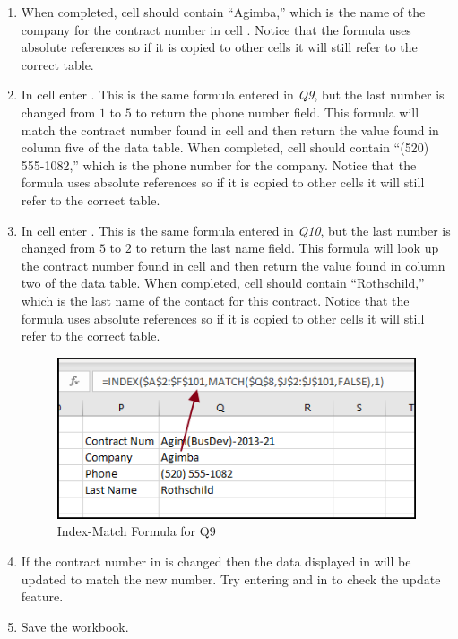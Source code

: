 \begin{enumerate}
	\item When completed, cell  should contain ``Agimba,'' which is the name of the company for the contract number in cell . Notice that the formula uses absolute references so if it is copied to other cells it will still refer to the correct table.
	\item In cell  enter . This is the same formula entered in \textit{Q9}, but the last number is changed from $ 1 $ to $ 5 $ to return the phone number field. This formula will match the contract number found in cell  and then return the value found in column five of the data table. When completed, cell  should contain ``(520) 555-1082,'' which is the phone number for the company.  Notice that the formula uses absolute references so if it is copied to other cells it will still refer to the correct table. 
	\item In cell  enter . This is the same formula entered in \textit{Q10}, but the last number is changed from $ 5 $ to $ 2 $ to return the last name field. This formula will look up the contract number found in cell  and then return the value found in column two of the data table. When completed, cell  should contain ``Rothschild,'' which is the last name of the contact for this contract.  Notice that the formula uses absolute references so if it is copied to other cells it will still refer to the correct table. 
	
	\begin{figure}[H]
		\centering
		\includegraphics[width=\maxwidth{.95\linewidth}]{gfx/ch09_fig37}
		\caption{Index-Match Formula for Q9}
		\label{09:fig37}
	\end{figure}
	
	\item If the contract number in  is changed then the data displayed in  will be updated to match the new number. Try entering  and  in  to check the update feature.
	\item Save the  workbook.
		
\end{enumerate}

